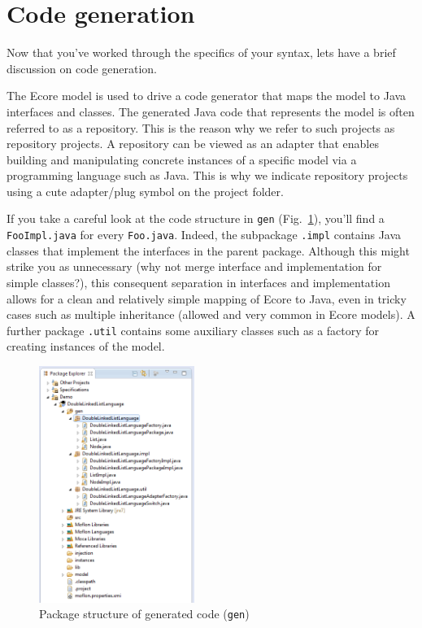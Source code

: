 \newpage
\genHeader
\hypertarget{codeGen common}{} 
\section{Code generation}

Now that you've worked through the specifics of your syntax, lets have a brief discussion on code generation.

The Ecore model is used to drive a code generator that maps the model to Java interfaces and classes. The generated Java code that represents the model is often
referred to as a repository. This is the reason why we refer to such projects as repository projects. A repository can be viewed as an adapter that enables
building and manipulating concrete instances of a specific model via a programming language such as Java. This is why we indicate repository projects using a
cute adapter/plug symbol on the project folder.

If you take a careful look at the code structure in \texttt{gen} (Fig.~\ref{eclipse:structureGen}), you'll find a \texttt{FooImpl.java} for every
\texttt{Foo.java}. Indeed, the subpackage \texttt{.impl} contains Java classes that implement the interfaces in the parent package. Although this might strike
you as unnecessary (why not merge interface and implementation for simple classes?), this consequent separation in interfaces and implementation allows for a
clean and relatively simple mapping of Ecore to Java, even in tricky cases such as multiple inheritance (allowed and very common in Ecore models). A further
package \texttt{.util} contains some auxiliary classes such as a factory for creating instances of the model.

 \begin{figure}[htbp]
  \centering
  \includegraphics[width=0.45\textwidth]{eclipse_structureGen}
  \caption{Package structure of generated code (\texttt{gen})}
  \label{eclipse:structureGen}
\end{figure}

